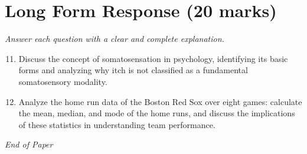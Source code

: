 \documentclass[12pt]{article}
\begin{document}
\section*{Long Form Response (20 marks)}
\textit{Answer each question with a clear and complete explanation.}
\begin{enumerate}[label=\arabic*.]
\setcounter{enumi}{10}
\item Discuss the concept of somatosensation in psychology, identifying its basic forms and analyzing why itch is not classified as a fundamental somatosensory modality.
\item Analyze the home run data of the Boston Red Sox over eight games: calculate the mean, median, and mode of the home runs, and discuss the implications of these statistics in understanding team performance.
\end{enumerate}

\vfill
\noindent\textit{End of Paper}
\end{document}
